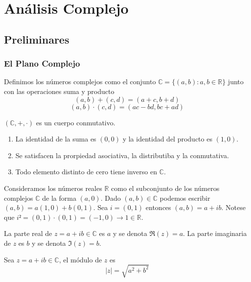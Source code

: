 \part{Análisis Complejo}
\chapter{Preliminares}
\section{El Plano Complejo}

\begin{defn}
  Definimos los números complejos como el conjunto $\mathbb{C} = \{ (a, b) : a, b \in \mathbb{R} \}$ junto con las operaciones suma y producto \[ (a, b) + (c, d) = (a + c, b + d) \] \[ (a, b) \cdot (c, d) = (ac - bd, bc + ad) \] 
\end{defn}

\begin{obs}
  $(\mathbb{C}, +, \cdot)$ es un cuerpo conmutativo. 
  \begin{enumerate}[label=(\roman*)]
    \item La identidad de la suma es $(0, 0)$ y la identidad del producto es $ (1,0)$.
    \item Se satisfacen la prorpiedad asociativa, la distributiba y la conmutativa.
    \item Todo elemento distinto de cero tiene inverso en $\mathbb{C}$.
  \end{enumerate}
\end{obs}

\begin{obs}
  Consideramos los números reales $\mathbb{R}$ como el subconjunto de los números complejos $\mathbb{C}$ de la forma $(a, 0)$.
  Dado $(a, b) \in \mathbb{C}$ podemos escribir $(a, b) = a(1, 0) + b (0, 1)$. Sea $i = (0, 1)$ entonces $(a, b) = a + ib$. Notese que $i² = (0, 1) \cdot (0, 1) = (-1, 0) \rightarrow 1 \in \mathbb{R}$.
\end{obs}

\begin{obs}
  La parte real de $z = a + ib \in \mathbb{C}$ es $ a$ y se denota $\Re(z) = a$. La parte imaginaria de $ z$ es $b$ y se denota $ \Im (z) = b$.
\end{obs}

\begin{defn}[Módulo]
  Sea $z = a+ib \in \mathbb{C}$, el módulo de $z$ es \[ |z| = \sqrt{a^{2} + b^{2}} \]
\end{defn}


